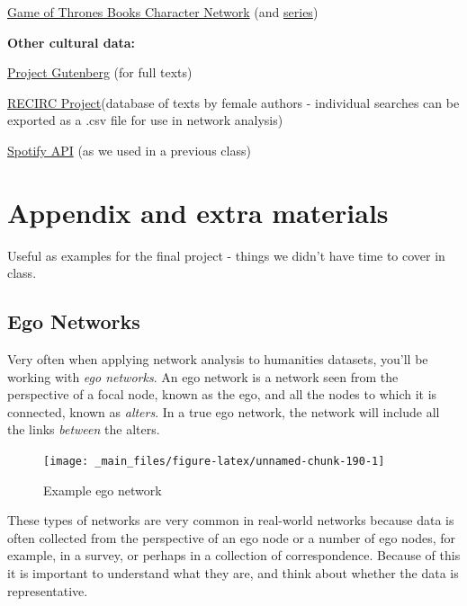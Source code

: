 \documentclass[
]{book}
\begin{document}
\href{https://github.com/mathbeveridge/asoiaf}{Game of Thrones Books Character Network} (and \href{https://github.com/mathbeveridge/gameofthrones}{series})

\textbf{Other cultural data:}

\href{https://www.gutenberg.org/}{Project Gutenberg} (for full texts)

\href{https://recirc.universityofgalway.ie/explore}{RECIRC Project}(database of texts by female authors - individual searches can be exported as a .csv file for use in network analysis)

\href{https://developer.spotify.com/documentation/web-api/}{Spotify API} (as we used in a previous class)

\hypertarget{appendix-and-extra-materials}{%
\chapter{Appendix and extra materials}\label{appendix-and-extra-materials}}

Useful as examples for the final project - things we didn't have time to cover in class.

\hypertarget{ego-networks}{%
\section{Ego Networks}\label{ego-networks}}

Very often when applying network analysis to humanities datasets, you'll be working with \emph{ego networks}. An ego network is a network seen from the perspective of a focal node, known as the ego, and all the nodes to which it is connected, known as \emph{alters}. In a true ego network, the network will include all the links \emph{between} the alters.

\begin{figure}

{\centering \texttt{[image: \_main\_files/figure-latex/unnamed-chunk-190-1]} 

}

\caption{Example ego network}\label{fig:unnamed-chunk-190}
\end{figure}

These types of networks are very common in real-world networks because data is often collected from the perspective of an ego node or a number of ego nodes, for example, in a survey, or perhaps in a collection of correspondence. Because of this it is important to understand what they are, and think about whether the data is representative.
\end{document}
